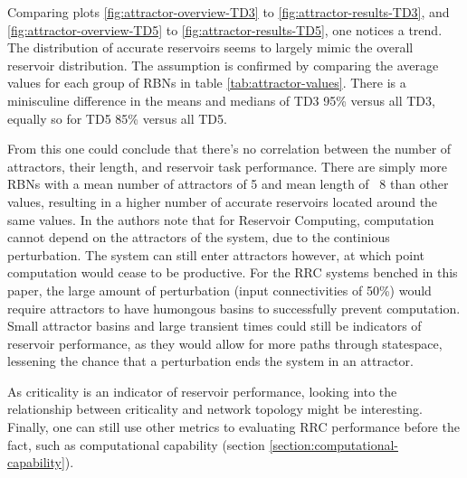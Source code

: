 Comparing plots \ref{fig:attractor-overview-TD3} to \ref{fig:attractor-results-TD3},
and \ref{fig:attractor-overview-TD5} to \ref{fig:attractor-results-TD5},
one notices a trend.
The distribution of accurate reservoirs seems to largely mimic the overall reservoir distribution.
The assumption is confirmed by comparing the average values for each group of RBNs in table \ref{tab:attractor-values}.
There is a minisculine difference in the means and medians of TD3 95\% versus all TD3,
equally so for TD5 85\% versus all TD5.

From this one could conclude that there's no correlation between the number of attractors, their length, and reservoir task performance.
There are simply more RBNs with a mean number of attractors of 5 and mean length of ~8 than other values,
resulting in a higher number of accurate reservoirs located around the same values.
In \cite{rbn-reservoir} the authors note that for Reservoir Computing,
computation cannot depend on the attractors of the system,
due to the continious perturbation.
The system can still enter attractors however,
at which point computation would cease to be productive.
For the RRC systems benched in this paper,
the large amount of perturbation (input connectivities of 50\%) would require attractors to have humongous basins to successfully prevent computation.
Small attractor basins and large transient times could still be indicators of reservoir performance,
as they would allow for more paths through statespace, lessening the chance that a perturbation ends the system in an attractor.

As criticality is an indicator of reservoir performance,
looking into the relationship between criticality and network topology might be interesting.
Finally, one can still use other metrics to evaluating RRC performance before the fact,
such as computational capability (section \ref{section:computational-capability}).
